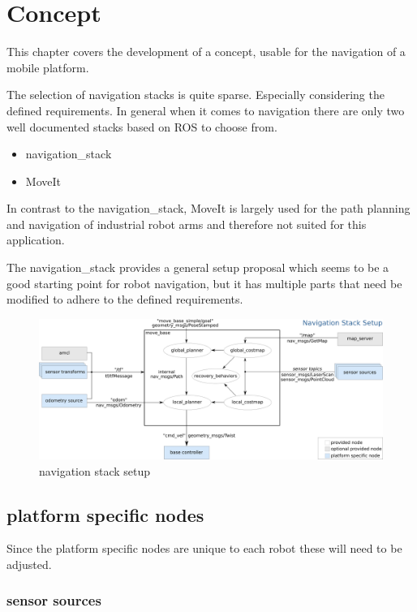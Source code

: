 \chapter{Concept}
\label{Concept}

This chapter covers the development of a concept, usable for the navigation of a mobile platform. 

The selection of navigation stacks is quite sparse. Especially considering the defined requirements. In general when it comes to navigation there are only two well documented stacks based on ROS to choose from.

\begin{itemize}
	\item navigation\_stack
	\item MoveIt
\end{itemize}

In contrast to the navigation\_stack, MoveIt is largely used for the path planning and navigation of industrial robot arms and therefore not suited for this application.

The navigation\_stack provides a general setup proposal which seems to be a good starting point for robot navigation, but it has multiple parts that need be modified to adhere to the defined requirements.

\begin{figure}[H]
	\centering
	\includegraphics[width=\textwidth]{Pictures/navigation stack setup}
	\caption{navigation stack setup\cite{movebase}}
	
	\label{navigation stack setup}
\end{figure}


\section{platform specific nodes}
Since the platform specific nodes are unique to each robot these will need to be adjusted.\\
\subsection{sensor sources}

